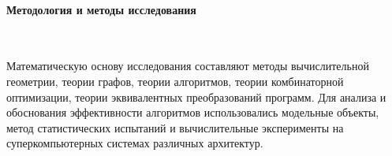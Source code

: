 \paragraph{Методология и методы исследования} \

Математическую основу исследования составляют методы вычислительной геометрии, теории графов, теории алгоритмов, теории комбинаторной оптимизации, теории эквивалентных преобразований программ.
Для анализа и обоснования эффективности алгоритмов использовались модельные объекты, метод статистических испытаний и вычислительные эксперименты на суперкомпьютерных системах различных архитектур.